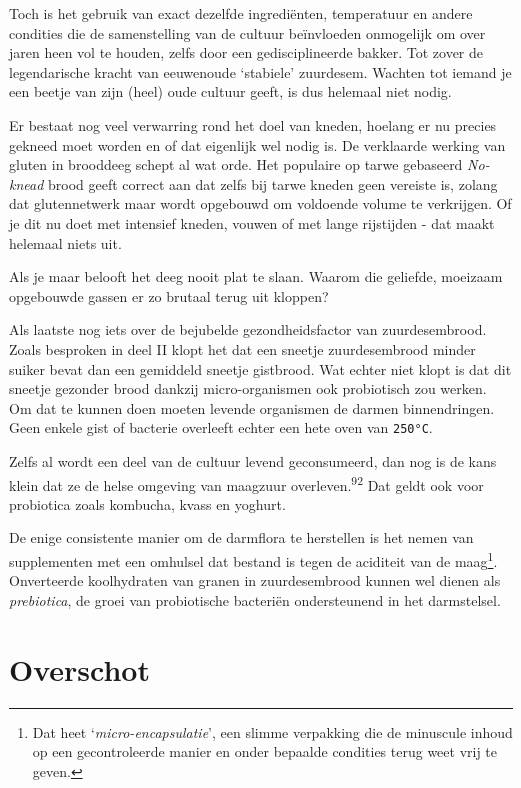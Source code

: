 \documentclass[
  11pt,
  dutch,
]{memoir}
\begin{document}
Toch is het gebruik van exact dezelfde ingrediënten, temperatuur en
andere condities die de samenstelling van de cultuur beïnvloeden
onmogelijk om over jaren heen vol te houden, zelfs door een
gedisciplineerde bakker. Tot zover de legendarische kracht van
eeuwenoude `stabiele' zuurdesem. Wachten tot iemand je een beetje van
zijn (heel) oude cultuur geeft, is dus helemaal niet nodig.

Er bestaat nog veel verwarring rond het doel van kneden, hoelang er nu
precies gekneed moet worden en of dat eigenlijk wel nodig is. De
verklaarde werking van gluten in brooddeeg schept al wat orde. Het
populaire op tarwe gebaseerd \emph{No-knead} brood geeft correct aan dat
zelfs bij tarwe kneden geen vereiste is, zolang dat glutennetwerk maar
wordt opgebouwd om voldoende volume te verkrijgen. Of je dit nu doet met
intensief kneden, vouwen of met lange rijstijden - dat maakt helemaal
niets uit.

Als je maar belooft het deeg nooit plat te slaan. Waarom die geliefde,
moeizaam opgebouwde gassen er zo brutaal terug uit kloppen?

Als laatste nog iets over de bejubelde gezondheidsfactor van
zuurdesembrood. Zoals besproken in deel II klopt het dat een sneetje
zuurdesembrood minder suiker bevat dan een gemiddeld sneetje gistbrood.
Wat echter niet klopt is dat dit sneetje gezonder brood dankzij
micro-organismen ook probiotisch zou werken. Om dat te kunnen doen
moeten levende organismen de darmen binnendringen. Geen enkele gist of
bacterie overleeft echter een hete oven van \texttt{250°C}.

Zelfs al wordt een deel van de cultuur levend geconsumeerd, dan nog is
de kans klein dat ze de helse omgeving van maagzuur
overleven.\textsuperscript{92} Dat geldt ook voor probiotica zoals
kombucha, kvass en yoghurt.

De enige consistente manier om de darmflora te herstellen is het nemen
van supplementen met een omhulsel dat bestand is tegen de aciditeit van
de maag\footnote{Dat heet `\emph{micro-encapsulatie}', een slimme
  verpakking die de minuscule inhoud op een gecontroleerde manier en
  onder bepaalde condities terug weet vrij te geven.}. Onverteerde
koolhydraten van granen in zuurdesembrood kunnen wel dienen als
\emph{prebiotica}, de groei van probiotische bacteriën ondersteunend in
het darmstelsel.

\hypertarget{overschot}{%
\chapter{Overschot}\label{overschot}}
\end{document}
